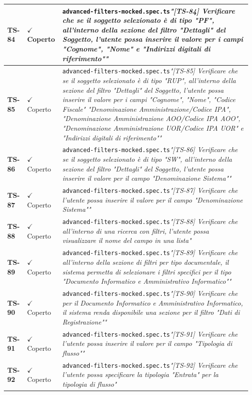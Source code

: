 \documentclass[a4paper,12pt]{article}
\newcommand{\ok}{\textcolor{green!60!black}{$\checkmark$ Coperto}}
\newcommand{\f}[1]{\nolinkurl{#1}\newline}
\newcommand{\q}[1]{\textit{#1}}
\begin{document}
\begin{longtable}{|p{1.5cm}|p{3.0cm}|p{10.5cm}|}
\textbf{TS-84} & \ok & \f{advanced-filters-mocked.spec.ts}\q{"[TS-84] Verificare che se il soggetto selezionato è di tipo "PF", all'interno della sezione del filtro "Dettagli" del Soggetto, l'utente possa inserire il valore per i campi "Cognome", "Nome" e "Indirizzi digitali di riferimento""} \\ \hline
\textbf{TS-85} & \ok & \f{advanced-filters-mocked.spec.ts}\q{"[TS-85] Verificare che se il soggetto selezionato è di tipo "RUP", all'interno della sezione del filtro "Dettagli" del Soggetto, l'utente possa inserire il valore per i campi "Cognome", "Nome", "Codice Fiscale" "Denominazione Amministrazione/Codice IPA", "Denominazione Amministrazione AOO/Codice IPA AOO", "Denominazione Amministrazione UOR/Codice IPA UOR" e "Indirizzi digitali di riferimento""} \\ \hline
\textbf{TS-86} & \ok & \f{advanced-filters-mocked.spec.ts}\q{"[TS-86] Verificare che se il soggetto selezionato è di tipo "SW", all'interno della sezione del filtro "Dettagli" del Soggetto, l'utente possa inserire il valore per il campo "Denominazione Sistema""} \\ \hline
\textbf{TS-87} & \ok & \f{advanced-filters-mocked.spec.ts}\q{"[TS-87] Verificare che l'utente possa inserire il valore per il campo "Denominazione Sistema""} \\ \hline
\textbf{TS-88} & \ok & \f{advanced-filters-mocked.spec.ts}\q{"[TS-88] Verificare che all'interno di una ricerca con filtri, l'utente possa visualizzare il nome del campo in una lista"} \\ \hline
\textbf{TS-89} & \ok & \f{advanced-filters-mocked.spec.ts}\q{"[TS-89] Verificare che all'interno della sezione di filtri per tipo documentale, il sistema permetta di selezionare i filtri specifici per il tipo "Documento Informatico e Amministrativo Informatico""} \\ \hline
\textbf{TS-90} & \ok & \f{advanced-filters-mocked.spec.ts}\q{"[TS-90] Verificare che per il Documento Informatico e Amministrativo Informatico, il sistema renda disponibile una sezione per il filtro "Dati di Registrazione""} \\ \hline
\textbf{TS-91} & \ok & \f{advanced-filters-mocked.spec.ts}\q{"[TS-91] Verificare che l'utente possa inserire il valore per il campo "Tipologia di flusso""} \\ \hline
\textbf{TS-92} & \ok & \f{advanced-filters-mocked.spec.ts}\q{"[TS-92] Verificare che l'utente possa specificare la tipologia "Entrata" per la tipologia di flusso"} \\ \hline

\end{longtable}
\end{document}
